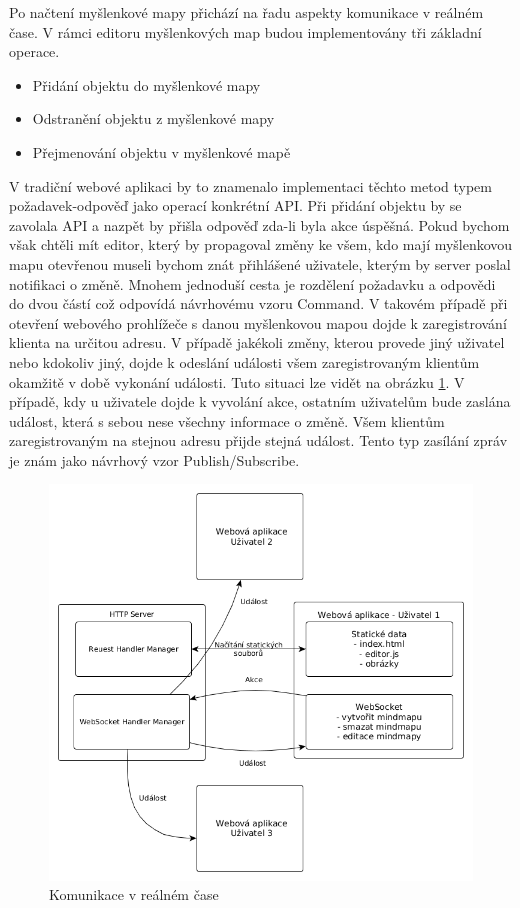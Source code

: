 Po načtení myšlenkové mapy přichází na řadu aspekty komunikace v reálném čase. V rámci editoru myšlenkových map budou implementovány tři základní operace.
\begin{itemize}
\item Přidání objektu do myšlenkové mapy
\item Odstranění objektu z myšlenkové mapy
\item Přejmenování objektu v myšlenkové mapě
\end{itemize}
V tradiční webové aplikaci by to znamenalo implementaci těchto metod typem požadavek-odpověď jako operací konkrétní API. Při přidání objektu by se zavolala API a nazpět by přišla odpověď zda-li byla akce úspěšná. Pokud bychom však chtěli mít editor, který by propagoval změny ke všem, kdo mají myšlenkovou mapu otevřenou museli bychom znát přihlášené uživatele, kterým by server poslal notifikaci o změně. Mnohem jednoduší cesta je rozdělení požadavku a odpovědi do dvou částí což odpovídá návrhovému vzoru Command. V takovém případě při otevření webového prohlížeče s danou myšlenkovou mapou dojde k zaregistrování klienta na určitou adresu. V případě jakékoli změny, kterou provede jiný uživatel nebo kdokoliv jiný, dojde k odeslání události všem zaregistrovaným klientům okamžitě v době vykonání události. Tuto situaci lze vidět na obrázku \ref{fig:realtime_communication}. V případě, kdy u uživatele dojde k vyvolání akce, ostatním uživatelům bude zaslána událost, která s sebou nese všechny informace o změně. Všem klientům zaregistrovaným na stejnou adresu přijde stejná událost. Tento typ zasílání zpráv je znám jako návrhový vzor Publish/Subscribe.

\begin{figure}
\begin{centering}
\includegraphics[width	=1\textwidth]{obrazky/realtime_communication}
\par\end{centering}
\caption{Komunikace v reálném čase\label{fig:realtime_communication}}
\end{figure}

